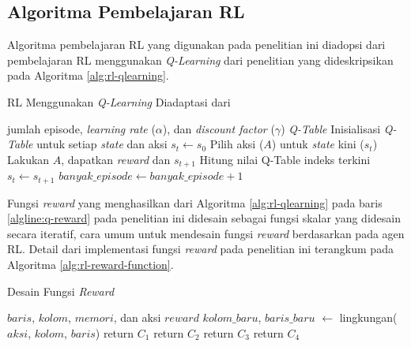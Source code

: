 \subsection{Algoritma Pembelajaran \acl{RL}}
\label{sec:sub-pembelajaran-rl}

Algoritma pembelajaran \ac{RL} yang digunakan pada penelitian ini diadopsi dari pembelajaran \ac{RL} menggunakan \textit{Q-Learning} dari penelitian \parencite{sutisna2023faraneq} yang dideskripsikan pada Algoritma \ref{alg:rl-qlearning}.

\begin{algorithm}
	\makeatletter
	\renewcommand{\ALG@name}{Algoritma}
	\makeatother
	\caption{\ac{RL} Menggunakan \textit{Q-Learning} Diadaptasi dari \parencite{sutisna2023faraneq}}\label{alg:rl-qlearning}
	\renewcommand{\algorithmicrequire}{\textbf{Masukan:}}
	\renewcommand{\algorithmicensure}{\textbf{Keluaran:}}
	\begin{algorithmic}[1]
		\Require jumlah episode, \textit{learning rate} ($\alpha$), dan \textit{discount factor} ($\gamma$)
		\Ensure \textit{Q-Table}
		\State Inisialisasi \textit{Q-Table} untuk setiap \textit{state} dan aksi
		\State $s_{t} \gets s_0$
		\State Pilih aksi ($A$) untuk \textit{state} kini ($s_t$)
		\State Lakukan $A$, dapatkan \textit{reward} dan $s_{t+1}$ \label{algline:q-reward}
		\State Hitung nilai Q-Table indeks terkini 
		\State $s_t \gets s_{t+1}$
		\EndWhile
		\State $banyak\_episode \gets banyak\_episode + 1$
		\EndWhile
	\end{algorithmic}
\end{algorithm}

Fungsi \textit{reward} yang menghasilkan dari Algoritma \ref{alg:rl-qlearning} pada baris \ref{algline:q-reward} pada penelitian ini didesain sebagai fungsi skalar yang didesain secara iteratif, cara umum untuk mendesain fungsi \textit{reward} berdasarkan \parencite{hayes2022practical} pada agen \ac{RL}. Detail dari implementasi fungsi \textit{reward} pada penelitian ini terangkum pada Algoritma \ref{alg:rl-reward-function}.

\begin{algorithm}
	\makeatletter
	\renewcommand{\ALG@name}{Algoritma}
	\makeatother
	\caption{Desain Fungsi \textit{Reward}}\label{alg:rl-reward-function}
	\renewcommand{\algorithmicrequire}{\textbf{Masukan:}}
	\renewcommand{\algorithmicensure}{\textbf{Keluaran:}}
	\begin{algorithmic}[1]
		\Require $baris$, $kolom$, $memori$, dan aksi
		\Ensure $reward$
		\State $kolom\_baru$, $baris\_baru$ $\gets$ lingkungan($aksi$, $kolom$, $baris$)
		 \label{algline:reward-c1}
		\State return $C_1$
		\EndIf
		 \label{algline:reward-c2}
		\State return $C_2$
		\EndIf
		 \label{algline:reward-c3}
		\State return $C_3$
		\EndIf
		\State return $C_4$ \label{algline:reward-c4}
	\end{algorithmic}
\end{algorithm}

